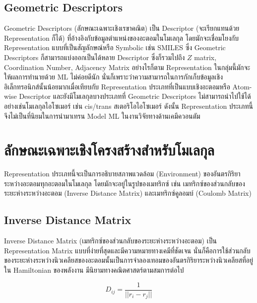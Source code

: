 \subsection{Geometric Descriptors}

Geometric Descriptors (ลักษณะเฉพาะเชิงเรขาคณิต) เป็น Descriptor (จะเรียกแทนด้วย Representation ก็ได้) ที่อ้างอิงกับข้อมูลตำแหน่งของอะตอมในโมเลกุล
โดยมักจะเชื่อมโยงกับ Representation แบบที่เป็นสัญลักษณ์หรือ Symbolic เช่น SMILES ซึ่ง Geometric Descriptors ก็สามารถแบ่งออกเป็นได้หลาย Descriptor 
ซึ่งก็รวมไปถึง $Z$ matrix, Coordination Number, Adjacency Matrix อย่างไรก็ตาม Representation ในกลุ่มนี้มักจะให้ผลการทำนายด้วย ML ไม่ค่อยดีนัก
นั่นก็เพราะว่าความสามารถในการกักเก็บข้อมูลเชิงอิเล็กทรอนิกส์นั้นน้อยมากเมื่อเทียบกับ Representation ประเภทที่เป็นแบบเชิงอะตอมหรือ Atom-wise Descriptor 
และยังมีโมเลกุลบางประเภทที่ Geometric Descriptors ไม่สามารถนำไปใช้ได้ อย่างเช่นโมเลกุลไอโซเมอร์ เช่น cis/trans สเตอริโอไอโซเมอร์
ดังนั้น Representation ประเภทนี้จึงไม่เป็นที่นิยมในการนำมาเทรน Model ML ในงานวิจัยทางด้านเคมีควอนตัม\cite{keith2021,musil2021}

\section{ลักษณะเฉพาะเชิงโครงสร้างสำหรับโมเลกุล}

Representation ประเภทนี้จะเป็นการอธิบายสภาพแวดล้อม (Environment) ของอันตรกิริยาระหว่างอะตอมทุกอะตอมในโมเลกุล โดยมักจะอยู่ในรูปของเมทริกซ์
เช่น เมทริกซ์ของส่วนกลับของระยะห่างระหว่างอะตอม (Inverse Distance Matrix) และเมทริกซ์คูลอมบ์ (Coulomb Matrix)

\subsection{Inverse Distance Matrix}

Inverse Distance Matrix (เมทริกซ์ของส่วนกลับของระยะห่างระหว่างอะตอม) เป็น Representation Matrix แบบที่ง่ายที่สุดและมีความหมายทางเคมีที่ชัดเจน
นั่นก็คือการใช้ส่วนกลับของระยะห่างระหว่างนิวเคลียสของอะตอมนั้นเป็นการจำลองเทอมของอันตรกิริยาระหว่างนิวเคลียสที่อยู่ใน Hamiltonian ของพลังงาน 
มีนิยามทางคณิตศาสตร์ตามสมการต่อไป

\begin{equation}
    D_{ij} = \frac{1}{||r_{i} - r_{j}||}
\end{equation}

